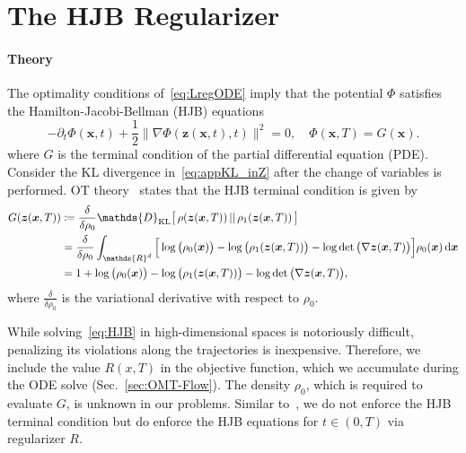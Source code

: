 \documentclass[letterpaper]{article}
\newcommand{\bfx}{\boldsymbol{x}}
\newcommand{\bfz}{\boldsymbol{z}}
\def\du{\ensuremath{\mathrm{d}}}
\newcommand{\R}{\ensuremath{\mathds{R}}}
\newcommand{\D}{\ensuremath{\mathds{D}}}
\begin{document}
\section{The HJB Regularizer}
\label{app:HJBReg}

	\paragraph{Theory}
	The optimality conditions of~\eqref{eq:LregODE} imply that the potential $\Phi$ satisfies the Hamilton-Jacobi-Bellman (HJB) equations~\cite{evans1983introduction}
	\begin{equation}
		\label{eq:HJB}
		-\partial_t \Phi(\bfx,t) + \frac{1}{2}\|\nabla \Phi(\bfz(\bfx,t),t)\|^2 = 0, \quad \Phi(\bfx,T)=G(\bfx).
	\end{equation}
	where $G$ is the terminal condition of the partial differential equation (PDE).
	Consider the KL divergence in~\eqref{eq:appKL_inZ} after the change of variables is performed.
	OT theory~\cite{villani2008optimal,benamou2017variational} states that the HJB terminal condition is given by
	\begin{equation}
	\label{eq:varderiv}
		\begin{split}
			G(\bfz(\bfx,T)) &\coloneqq \frac{\delta}{\delta \rho_0}  \D_{\rm KL} \big[ \, \rho(\bfz(\bfx,T)) \, || \, \rho_1(\bfz(\bfx,T)) \, \big]
			\\
			&= \frac{\delta}{\delta \rho_0} \int_{\R^d} \Big[ \log\big(\rho_0(\bfx)\big) - \log\big(\rho_1(\bfz(\bfx,T))\big) - \log\det\big(\nabla \bfz(\bfx,T)\big) \Big] \rho_0(\bfx) \, \du \bfx
			\\
			&= 1 + \log\big(\rho_0(\bfx)\big) - \log\big(\rho_1(\bfz(\bfx,T))\big) - \log\det\big(\nabla \bfz(\bfx,T)\big),
		\end{split}
	\end{equation}
	where $\frac{\delta}{\delta \rho_0}$ is the variational derivative with respect to $\rho_0$. 	
	
	While solving~\eqref{eq:HJB} in high-dimensional spaces is notoriously difficult, penalizing its violations along the trajectories is inexpensive. Therefore, we include the value $R(x,T)$ in the objective function, which we accumulate during the ODE solve (Sec.~\ref{sec:OMT-Flow}). The density $\rho_0$, which is required to evaluate $G$, is unknown in our problems. Similar to~\citet{yang2019}, we do not enforce the HJB terminal condition but do enforce the HJB equations for $t \in (0,T)$ via regularizer $R$.
	
\end{document}
